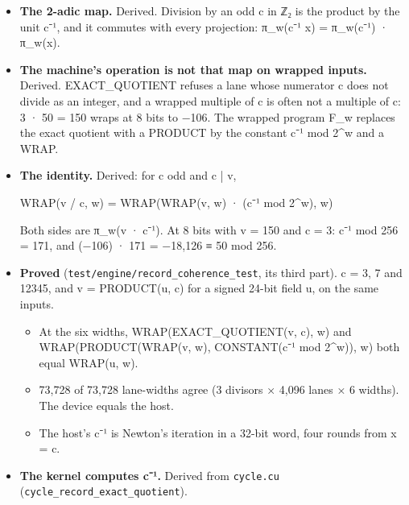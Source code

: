 \begin{itemize}
\item \textbf{The 2-adic map.} Derived. Division by an odd c in ℤ₂ is the product by the unit c⁻¹, and it commutes with every projection: π\_\allowbreak{}w(c⁻¹ x) = π\_\allowbreak{}w(c⁻¹) · π\_\allowbreak{}w(x).
\item \textbf{The machine's operation is not that map on wrapped inputs.} Derived. EXACT\_\allowbreak{}QUOTIENT refuses a lane whose numerator c does not divide as an integer, and a wrapped multiple of c is often not a multiple of c: 3 · 50 = 150 wraps at 8 bits to −106. The wrapped program F\_\allowbreak{}w replaces the exact quotient with a PRODUCT by the constant c⁻¹ mod 2\textasciicircum{}w and a WRAP.
\item \textbf{The identity.} Derived: for c odd and c | v,

WRAP(v / c, w) = WRAP(WRAP(v, w) · (c⁻¹ mod 2\textasciicircum{}w), w)

Both sides are π\_\allowbreak{}w(v · c⁻¹). At 8 bits with v = 150 and c = 3: c⁻¹ mod 256 = 171, and (−106) · 171 = −18,126 ≡ 50 mod 256.
\item \textbf{Proved} (\texttt{test/\allowbreak{}engine/\allowbreak{}record\_\allowbreak{}coherence\_\allowbreak{}test}, its third part). c = 3, 7 and 12345, and v = PRODUCT(u, c) for a signed 24-bit field u, on the same inputs.

\begin{itemize}
\item At the six widths, WRAP(EXACT\_\allowbreak{}QUOTIENT(v, c), w) and WRAP(PRODUCT(WRAP(v, w), CONSTANT(c⁻¹ mod 2\textasciicircum{}w)), w) both equal WRAP(u, w).
\item 73,728 of 73,728 lane-widths agree (3 divisors × 4,096 lanes × 6 widths). The device equals the host.
\item The host's c⁻¹ is Newton's iteration in a 32-bit word, four rounds from x = c.
\end{itemize}
\item \textbf{The kernel computes c⁻¹.} Derived from \texttt{cycle.\allowbreak{}cu} (\texttt{cycle\_\allowbreak{}record\_\allowbreak{}exact\_\allowbreak{}quotient}).


\end{itemize}
